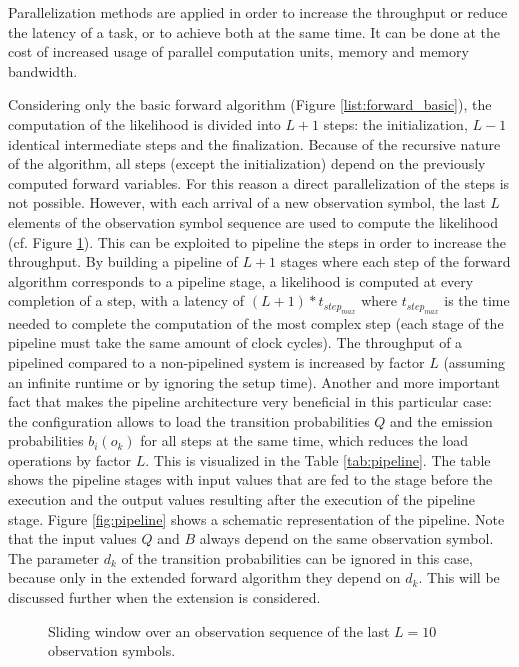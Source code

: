 \documentclass[mscthesis]{usiinfthesis}
\begin{document}
Parallelization methods are applied in order to increase the throughput or
reduce the latency of a task, or to achieve both at the same time. It can be
done at the cost of increased usage of parallel computation units, memory and
memory bandwidth.

Considering only the basic forward algorithm (Figure
\ref{list:forward_basic}), the computation of the likelihood is divided into
$L+1$ steps: the initialization, $L-1$ identical intermediate steps and the
finalization. Because of the recursive nature of the algorithm, all steps
(except the initialization) depend on the previously computed forward
variables. For this reason a direct parallelization of the steps is not
possible. However, with each arrival of a new observation symbol, the last $L$
elements of the observation symbol sequence are used to compute the likelihood
(cf. Figure \ref{fig:sliding}). This can be exploited to pipeline the steps in
order to increase the throughput. By building a pipeline of $L+1$ stages where
each step of the forward algorithm corresponds to a pipeline stage,
a likelihood is computed at every completion of a step, with a latency of
$(L+1)*t_{step_{max}}$ where $t_{step_{max}}$ is the time needed to complete
the computation of the most complex step (each stage of the pipeline must take
the same amount of clock cycles). The throughput of a pipelined compared to
a non-pipelined system is increased by factor $L$ (assuming an infinite runtime
or by ignoring the setup time). Another and more important fact that makes the
pipeline architecture very beneficial in this particular case: the
configuration allows to load the transition probabilities $Q$ and the emission
probabilities $b_i(o_k)$ for all steps at the same time, which reduces the load
operations by factor $L$. This is visualized in the Table \ref{tab:pipeline}.
The table shows the pipeline stages with input values that are fed to the stage
before the execution and the output values resulting after the execution of
the pipeline stage. Figure \ref{fig:pipeline} shows a schematic representation
of the pipeline. Note that the input values $Q$ and $B$ always depend on
the same observation symbol. The parameter $d_k$ of the transition
probabilities can be ignored in this case, because only in the extended forward
algorithm they depend on $d_k$. This will be discussed further when the
extension is considered.

\begin{figure}
    \centering
    
    \caption{Sliding window over an observation sequence of the
        last $L=10$ observation symbols.}
    \label{fig:sliding}
\end{figure}
\end{document}
